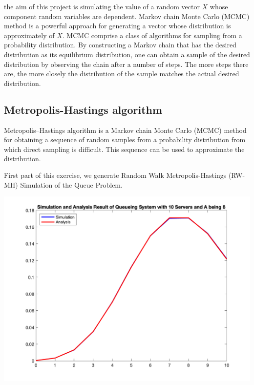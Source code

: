 the aim of this project is simulating the value of a random vector $X$ whose component random variables are dependent. Markov chain Monte Carlo (MCMC) method is a powerful approach for generating a vector whose distribution is approximately of $X$. MCMC comprise a class of algorithms for sampling from a probability distribution. By constructing a Markov chain that has the desired distribution as its equilibrium distribution, one can obtain a sample of the desired distribution by observing the chain after a number of steps. The more steps there are, the more closely the distribution of the sample matches the actual desired distribution.\\
\subsection{Metropolis-Hastings algorithm}
Metropolis–Hastings algorithm is a Markov chain Monte Carlo (MCMC) method for obtaining a sequence of random samples from a probability distribution from which direct sampling is difficult. This sequence can be used to approximate the distribution.

First part of this exercise, we generate Random Walk Metropolis-Hastings (RW-MH) Simulation of the Queue Problem.

\begin{center}
    \includegraphics[scale=0.6]{Figures/figure6_1.png}\\
\end{center}

